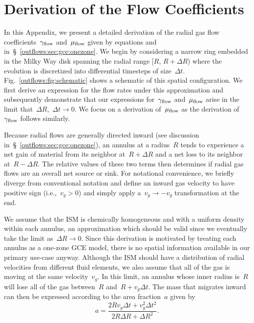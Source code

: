 \documentclass[main.tex]{subfiles}
\begin{document}
\chapter{Derivation of the Flow Coefficients}
\label{outflows:sec:coefficients-derivation}

In this Appendix, we present a detailed derivation of the radial gas flow
coefficients~$\gamma_{\text{flow}}$ and~$\mu_{\text{flow}}$ given by equations
 and~
in~\S~\ref{outflows:sec:gce:onezone}.
We begin by considering a narrow ring embedded in the Milky Way disk spanning
the radial range [$R$, $R + \Delta R$) where the evolution is discretized into
differential timesteps of size~$\Delta t$.
Fig.~\ref{outflows:fig:schematic} shows a schematic of this
spatial configuration.
We first derive an expression for the flow rates under this approximation and
subsequently demonstrate that our expressions for~$\gamma_{\text{flow}}$
and~$\mu_{\text{flow}}$ arise in the limit that~$\Delta R$,~$\Delta t \rightarrow 0$.
We focus on a derivation of~$\mu_{\text{flow}}$ as the derivation of~$\gamma_{\text{flow}}$
follows similarly.
\par
Because radial flows are generally directed inward (see discussion
in~\S~\ref{outflows:sec:gce:onezone}), an annulus at a radius~$R$ tends to
experience a net gain of material from its neighbor at~$R + \Delta R$ and a net
loss to its neighbor at~$R - \Delta R$.
The relative values of these two terms then determines if radial gas flows are
an overall net source or sink.
For notational convenience, we briefly diverge from conventional notation and
define an inward gas velocity to have positive sign (i.e.,~$v_g > 0$) and
simply apply a~$v_g \rightarrow -v_g$ transformation at the end.
\par
We assume that the ISM is chemically homogeneous and with a uniform density
within each annulus, an approximation which should be valid since we eventually
take the limit as~$\Delta R \rightarrow 0$.
Since this derivation is motivated by treating each annulus as a one-zone GCE
model, there is no spatial information available in our primary use-case anyway.
Although the ISM should have a distribution of radial velocities from different
fluid elements, we also assume that all of the gas is moving at the same
velocity~$v_g$.
In this limit, an annulus whose inner radius is~$R$ will lose all of the gas
between~$R$ and~$R + v_g \Delta t$.
The mass that migrates inward can then be expressed according to the area
fraction~$a$ given by
\begin{equation}
a = \frac{
	2 R v_g \Delta t + v_g^2 \Delta t^2
}{
	2 R \Delta R + \Delta R^2
}.
\label{outflows:eq:area-frac-def}
\end{equation}
\end{document}
